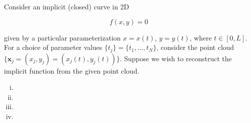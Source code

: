 Consider an implicit (closed) curve in 2D

$$
f(x, y) = 0
$$

given by a particular parameterization $x = x(t)$, $y = y(t)$, where $t \in [0, L]$. For a choice of parameter values
$\{t_j\} = \{t_1, \dots, t_N\}$, consider the point cloud 
$\{ \bm{x}_j = \left( x_j, y_j \right) = \left( x_j(t), y_j(t) \right) \}$. Suppose we wish to reconstruct the implicit 
function from the given point cloud.


\begin{enumerate}[(i)]
  \item 
  \pagebreak
  \item 
  \pagebreak
  \item 
  \pagebreak
  \item 
  \pagebreak
\end{enumerate}